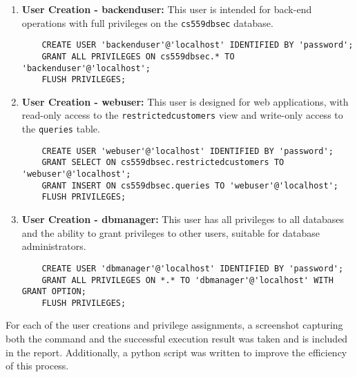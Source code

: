 \documentclass{article}
\begin{document}
\begin{enumerate}
    \item \textbf{User Creation - backenduser:}
    This user is intended for back-end operations with full privileges on the \texttt{cs559dbsec} database.
    \begin{verbatim}
    CREATE USER 'backenduser'@'localhost' IDENTIFIED BY 'password';
    GRANT ALL PRIVILEGES ON cs559dbsec.* TO 'backenduser'@'localhost';
    FLUSH PRIVILEGES;
    \end{verbatim}

    \item \textbf{User Creation - webuser:}
    This user is designed for web applications, with read-only access to the \texttt{restrictedcustomers} view and write-only access to the \texttt{queries} table.
    \begin{verbatim}
    CREATE USER 'webuser'@'localhost' IDENTIFIED BY 'password';
    GRANT SELECT ON cs559dbsec.restrictedcustomers TO 'webuser'@'localhost';
    GRANT INSERT ON cs559dbsec.queries TO 'webuser'@'localhost';
    FLUSH PRIVILEGES;
    \end{verbatim}

    \item \textbf{User Creation - dbmanager:}
    This user has all privileges to all databases and the ability to grant privileges to other users, suitable for database administrators.
    \begin{verbatim}
    CREATE USER 'dbmanager'@'localhost' IDENTIFIED BY 'password';
    GRANT ALL PRIVILEGES ON *.* TO 'dbmanager'@'localhost' WITH GRANT OPTION;
    FLUSH PRIVILEGES;
    \end{verbatim}
\end{enumerate}

For each of the user creations and privilege assignments, a screenshot capturing both the command and the successful execution result was taken and is included in the report. Additionally, a python script was written to improve the efficiency of this process.
\end{document}
